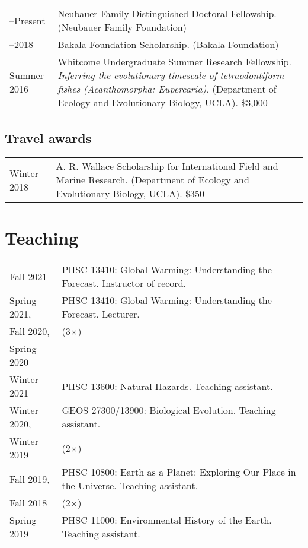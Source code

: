 \documentclass[10pt]{article}
\begin{document}
\begin{tabularx}{\textwidth}{>{\raggedleft\arraybackslash}p{2.2cm} X}
2018--Present & Neubauer Family Distinguished Doctoral Fellowship. (Neubauer Family Foundation) \\[0.1cm]
2014--2018 & Bakala Foundation Scholarship. (Bakala Foundation) \\[0.1cm]
Summer 2016 & Whitcome Undergraduate Summer Research Fellowship. \textit{Inferring the evolutionary timescale of tetraodontiform fishes (Acanthomorpha: Eupercaria).} (Department of Ecology and Evolutionary Biology, UCLA). \$3,000
\end{tabularx}

\subsection*{Travel awards}

\begin{tabularx}{\textwidth}{>{\raggedleft\arraybackslash}p{2.2cm} X}
Winter 2018 & A. R. Wallace Scholarship for International Field and Marine Research. (Department of Ecology and Evolutionary Biology, UCLA). \$350
\end{tabularx}

\section*{Teaching}

\begin{tabularx}{\textwidth}{>{\raggedleft\arraybackslash}p{2.2cm} X}
Fall 2021 & PHSC 13410: Global Warming: Understanding the Forecast. Instructor of record. \\[0.1cm]
Spring 2021, & PHSC 13410: Global Warming: Understanding the Forecast. Lecturer. \\
Fall 2020, & (3$\times$) \\
Spring 2020 & \\[0.1cm]
Winter 2021 & PHSC 13600: Natural Hazards. Teaching assistant. \\[0.1cm]
Winter 2020, & GEOS 27300/13900: Biological Evolution. Teaching assistant. \\
Winter 2019 & (2$\times$) \\[0.1cm]
Fall 2019, & PHSC 10800: Earth as a Planet: Exploring Our Place in the Universe. Teaching assistant. \\
Fall 2018 & (2$\times$) \\[0.1cm]
Spring 2019 & PHSC 11000: Environmental History of the Earth. Teaching assistant.
\end{tabularx}
\end{document}
